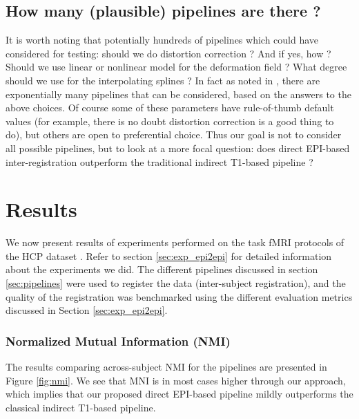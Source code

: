 \subsection{How many (plausible) pipelines are there ?}
It is worth noting that potentially hundreds of pipelines which could
have considered for testing: should we do distortion correction ? And
if yes, how ? Should we use linear or nonlinear model for the
deformation field ?
%
What degree should we use for the interpolating splines ? In fact as
noted in \citep{Poldrack059188}, there are exponentially many pipelines
that can be considered, based on the answers to the above choices.
%
Of course some of these parameters have rule-of-thumb default values
(for example, there is no doubt distortion correction is a good thing
to do), but others are open to preferential choice. Thus our goal is
not to consider all possible pipelines, but to look at a more focal
question: does direct EPI-based inter-registration outperform the
traditional indirect T1-based pipeline ?


\section{Results}
\label{sec:results}
We now present results of experiments performed on the task fMRI
protocols of the HCP dataset \citep{VanEssen20122222}. Refer to
section \ref{sec:exp_epi2epi} for detailed information about the
experiments we did. The different pipelines discussed in section
\ref{sec:pipelines} were used to register the data (inter-subject
registration), and the quality of the registration was benchmarked
using the different evaluation metrics discussed in Section \ref{sec:exp_epi2epi}. 

\subsubsection{Normalized Mutual Information (NMI)}
The results comparing across-subject NMI for the pipelines are presented in Figure \ref{fig:nmi}. We see that MNI is in most cases higher through our approach, which implies that 
our proposed direct EPI-based pipeline mildly outperforms the classical indirect T1-based pipeline.

